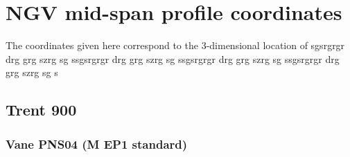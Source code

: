 \documentclass[a4paper, 11pt, oneside]{report}
\begin{document}
\chapter{NGV mid-span profile coordinates}

The coordinates given here correspond to the 3-dimensional location of sgsrgrgr drg grg  szrg sg ssgsrgrgr drg grg  szrg sg ssgsrgrgr drg grg  szrg sg ssgsrgrgr drg grg  szrg sg s

\section{Trent 900}

\subsection{Vane PNS04 (M EP1 standard)}
\end{document}
